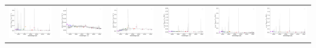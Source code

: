 \begin{center}
\begin{longtable}{l l l l l l }
    \includegraphics[width=0.3\linewidth, clip]{Figs/Figs-sdss/spec-7822-57041-0278-STRIPE82-0061-047759.pdf} & \includegraphics[width=0.3\linewidth, clip]{Figs/Figs-sdss/spec-9147-58038-0401-SPLUS-s02s08-004413.pdf} & \includegraphics[width=0.3\linewidth, clip]{Figs/Figs-sdss/spec-9207-57667-0050-STRIPE82-0148-001139.pdf} & \includegraphics[width=0.3\linewidth, clip]{Figs/Figs-sdss/spec-0406-51900-0604-STRIPE82-0054-040145.pdf} & \includegraphics[width=0.3\linewidth, clip]{Figs/Figs-sdss/spec-0408-51821-0296-STRIPE82-0057-019420.pdf} & \includegraphics[width=0.3\linewidth, clip]{Figs/Figs-sdss/spec-0409-51871-0225-STRIPE82-0059-048815.pdf} \\

\end{longtable}
\end{center}
